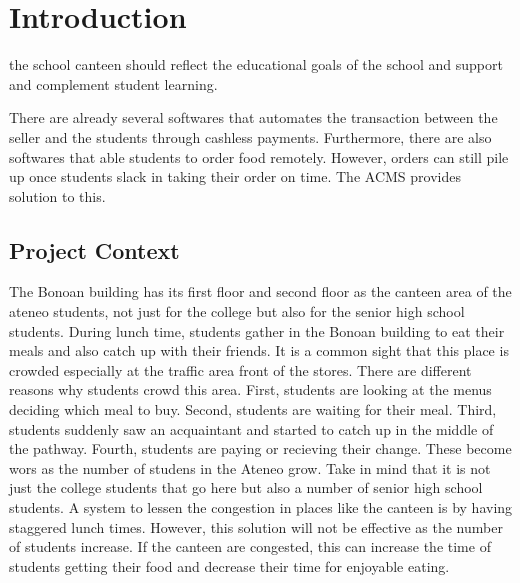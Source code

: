 \documentclass{article}
\author{Jonel C. Ganalon}
\date{19 March 2024}
\begin{document}
\section{Introduction}
the school canteen should reflect the educational goals of the school and support and complement student learning.

There are already several softwares that automates the transaction between the seller and the students through cashless payments. Furthermore, there are also softwares that able students to order food remotely. However, orders can still pile up once students slack in taking their order on time. The ACMS provides solution to this.

\subsection{Project Context}
The Bonoan building has its first floor and second floor as the canteen area of the ateneo students, not just for the college but also for the senior high school students.
During lunch time, students gather in the Bonoan building to eat their meals and also catch up with their friends. It is a common sight that this place is crowded especially at the traffic area front of the stores. There are different reasons why students crowd this area. First, students are looking at the menus deciding which meal to buy. Second, students are waiting for their meal. Third, students suddenly saw an acquaintant and started to catch up in the middle of the pathway. Fourth, students are paying or recieving their change. These become wors as the number of studens in the Ateneo grow. Take in mind that it is not just the college students that go here but also a number of senior high school students. A system to lessen the congestion in places like the canteen is by having staggered lunch times. However, this solution will not be effective as the number of students increase. If the canteen are congested, this can increase the time of students getting their food and decrease their time for enjoyable eating.


\end{document}
